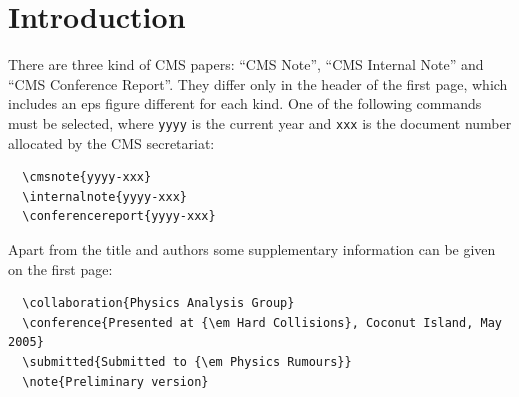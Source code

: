 \documentclass{cmspaper}
\begin{document}
%
%
%
%
%  
%

\section{Introduction}

    There are three kind of CMS papers: ``CMS Note'', 
    ``CMS Internal Note'' and ``CMS Conference Report''.
    They differ only in the header of the first page,
    which includes an eps figure different for each kind.
    One of the following commands must be selected,
    where \verb$yyyy$ is the current year
    and \verb$xxx$ is the document number allocated by the CMS secretariat:
{\small \begin{verbatim}
  \cmsnote{yyyy-xxx}
  \internalnote{yyyy-xxx}
  \conferencereport{yyyy-xxx}
\end{verbatim} }
    
Apart from the title and authors some supplementary information can be given
on the first page:
{\small \begin{verbatim}
  \collaboration{Physics Analysis Group}
  \conference{Presented at {\em Hard Collisions}, Coconut Island, May 2005}
  \submitted{Submitted to {\em Physics Rumours}}
  \note{Preliminary version}
\end{verbatim} }
\end{document}
